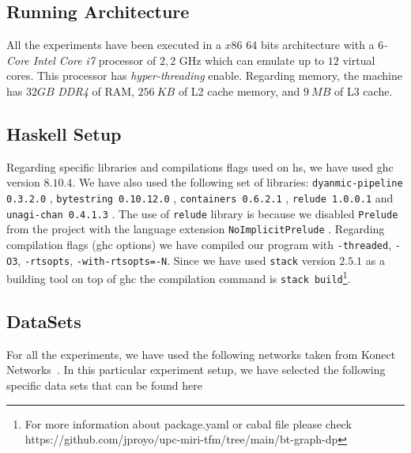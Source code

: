 \subsection{Running Architecture}
All the experiments have been executed in a $x86$ $64$ bits architecture with a \textit{$6$-Core Intel Core i7} processor of $2,2$ GHz which can emulate up to $12$ virtual cores. 
This processor has \emph{hyper-threading} enable. Regarding memory, the machine has $32 GB$ \emph{DDR4} of RAM, $256\ KB$ of L2 cache memory, and $9\ MB$ of L3 cache.

\subsection{Haskell Setup}
Regarding specific libraries and compilations flags used on \acrshort{hs}, we have used \acrshort{ghc} version $8.10.4$. We have also used the following set of libraries: 
\texttt{dyanmic-pipeline 0.3.2.0} \cite{dynamic-pipeline}, \texttt{bytestring 0.10.12.0} \cite{bytestring}, \texttt{containers 0.6.2.1} \cite{containers}, 
\texttt{relude 1.0.0.1} \cite{relude} and \texttt{unagi-chan 0.4.1.3} \cite{unagi}. The use of \texttt{relude} library is because we disabled 
\texttt{Prelude} from the project with the language extension \texttt{NoImplicitPrelude} \cite{extensions}. Regarding compilation flags 
(\acrshort{ghc} options) we have compiled our program with \texttt{-threaded}, \texttt{-O3}, \texttt{-rtsopts}, \texttt{-with-rtsopts=-N}. 
Since we have used \texttt{stack} version $2.5.1$ \cite{stack} as a building tool on top of \acrshort{ghc} the compilation command is \texttt{stack build}\footnote{For more information about package.yaml or cabal file please check https://github.com/jproyo/upc-miri-tfm/tree/main/bt-graph-dp}.

\subsection{DataSets}\label{data:set}

For all the experiments, we have used the following networks taken from Konect Networks~\cite{konect}. In this particular experiment setup, we have selected the following specific data sets that can be found here \cite{konect:2017:dbpedia-recordlabel,konect:2017:moreno_crime,konect:2017:opsahl-ucforum,konect:2017:wang-amazon}

